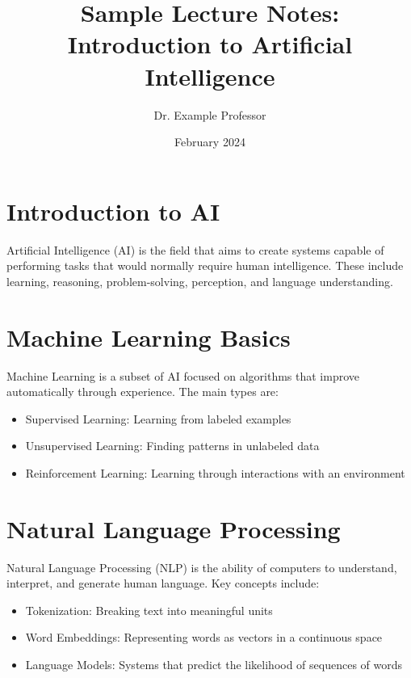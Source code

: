 \documentclass{article}
\begin{document}
\title{Sample Lecture Notes: Introduction to Artificial Intelligence}
\author{Dr. Example Professor}
\date{February 2024}
\maketitle

\section{Introduction to AI}
Artificial Intelligence (AI) is the field that aims to create systems capable of performing tasks that would normally require human intelligence. These include learning, reasoning, problem-solving, perception, and language understanding.

\section{Machine Learning Basics}
Machine Learning is a subset of AI focused on algorithms that improve automatically through experience. The main types are:
\begin{itemize}
    \item Supervised Learning: Learning from labeled examples
    \item Unsupervised Learning: Finding patterns in unlabeled data
    \item Reinforcement Learning: Learning through interactions with an environment
\end{itemize}

\section{Natural Language Processing}
Natural Language Processing (NLP) is the ability of computers to understand, interpret, and generate human language. Key concepts include:
\begin{itemize}
    \item Tokenization: Breaking text into meaningful units
    \item Word Embeddings: Representing words as vectors in a continuous space
    \item Language Models: Systems that predict the likelihood of sequences of words
\end{itemize}
\end{document}

